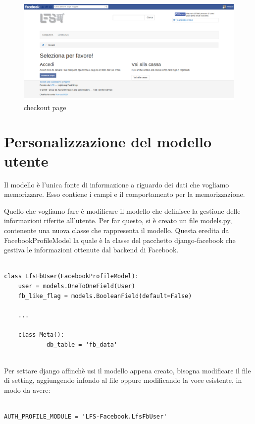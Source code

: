 \begin{figure}
\centering
\includegraphics[width=0.9\columnwidth]{img/checkout}
\caption{checkout page}
\end{figure}

\section{Personalizzazione del modello utente}
Il modello è l'unica fonte di informazione a riguardo dei dati che vogliamo memorizzare. Esso contiene i campi e il comportamento per la memorizzazione. 

Quello che vogliamo fare è modificare il modello che definisce la gestione delle informazioni riferite all'utente. Per far questo, si è creato un file models.py, contenente una nuova classe che rappresenta il modello. Questa eredita da FacebookProfileModel la quale è la classe del pacchetto django-facebook che gestiva le informazioni ottenute dal backend di Facebook.

\begin{lstlisting}

class LfsFbUser(FacebookProfileModel):
    user = models.OneToOneField(User)
    fb_like_flag = models.BooleanField(default=False)
	
	...	
	
    class Meta():
            db_table = 'fb_data'
            
\end{lstlisting}

Per settare django affinchè usi il modello appena creato, bisogna modificare il file di setting, aggiungendo infondo al file oppure modificando la voce esistente, in modo da avere:

\begin{lstlisting}

AUTH_PROFILE_MODULE = 'LFS-Facebook.LfsFbUser'

\end{lstlisting}

